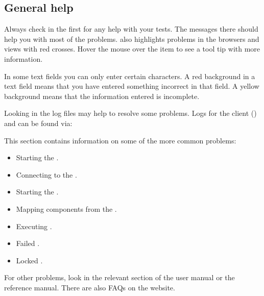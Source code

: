 % 
%
%
\label{errorHandling}

\subsection{General help}
Always check in the \gdprobview{} first for any help with your tests. The messages there should help you with most of the problems. \app{} also highlights problems in the browsers and views with red crosses. Hover the mouse over the item to see a tool tip with more information. 

In some text fields you can only enter certain characters. A red background in a text field means that you have entered something incorrect in that field. A yellow background means that the information entered is incomplete. 

Looking in the log files may help to resolve some problems. Logs for the client (\ite{}) and \gdagent{} can be found via:\\

This section contains information on some of the more common problems:
\begin{itemize}
\item Starting the \gdagent{} .
\item Connecting to the \gdagent{} .
\item Starting the \gdaut{} .
\item Mapping components from the \gdaut{} .
\item Executing \gdsuites{} .
\item Failed \gdsuites{} . 
\item Locked \gdcases{}   .
\end{itemize}


For other problems, look in the relevant section of the user manual or the reference manual. There are also FAQs on the \app{} website.



